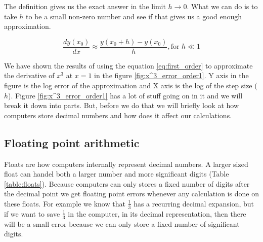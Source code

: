 The definition gives us the exact answer in the limit $h \to 0$. What we can do is to take $h$ to be a small non-zero number and see if that gives us a good enough approximation.

\begin{equation}
    \frac{dy(x_0)}{dx} \approx \frac{y(x_0 + h) - y(x_0)}{h} , \text{for } h \ll 1
    \label{eq:first_order}
\end{equation}

We have shown the results of using the equation \ref{eq:first_order} to approximate the derivative of $x^3$ at $x=1$ in the figure \ref{fig:x^3_error_order1}. Y axis in the figure is the log error of the approximation and X axis is the log of the  step size ($h$). Figure \ref{fig:x^3_error_order1} has a lot of stuff going on in it and we will break it down into parts. But, before we do that we will briefly look at how computers store decimal numbers and how does it affect our calculations.

\subsection{Floating point arithmetic}

 Floats are how computers internally represent decimal numbers. A larger sized float can handel both a larger number and more significant digits (Table \ref{table:floats}). Because computers can only stores a fixed number of digits after the decimal point we get  floating point errors whenever any calculation is done on these floats. For example we know that $\frac{1}{3}$ has a recurring decimal expansion, but if we want to save $\frac{1}{3}$ in the computer, in its decimal representation, then there will be a small error because we can only store a fixed number of significant digits.




